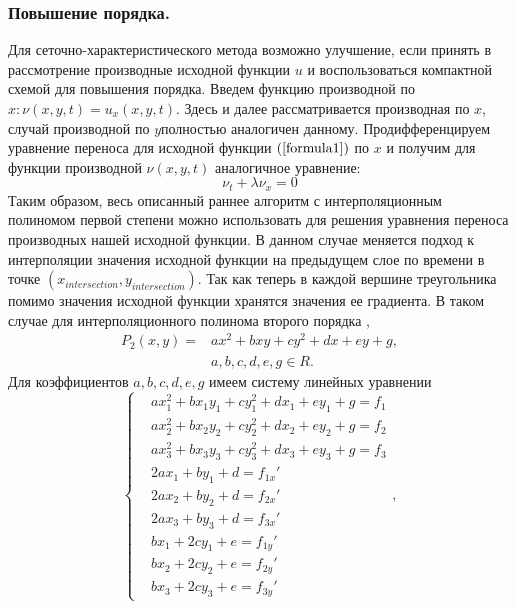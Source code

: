 \documentclass[14pt]{article}
\begin{document}
\subsubsection{Повышение порядка.}
Для сеточно-характеристического метода возможно улучшение, если принять в рассмотрение производные исходной функции $u$ и воспользоваться компактной схемой для повышения порядка. Введем функцию производной по $x: \nu(x,y,t)=u_x (x,y,t)$. Здесь и далее рассматривается производная по $x$, случай производной по $y $полностью аналогичен данному. Продифференцируем уравнение переноса для исходной функции $(\ref{formula1})$ по $x$ и получим для функции производной $\nu(x,y,t)$ аналогичное уравнение:
\begin{equation}
\nu_t+\lambda \nu_x=0
\end{equation}
Таким образом, весь описанный раннее алгоритм с интерполяционным полиномом первой степени можно использовать для решения уравнения переноса производных нашей исходной функции. В данном случае меняется подход к интерполяции значения исходной функции на предыдущем слое по времени в точке $(x_{intersection},y_{intersection})$. Так как теперь в каждой вершине треугольника помимо значения исходной функции хранятся значения ее градиента. В таком случае для интерполяционного полинома второго порядка ,
\begin{equation}
\begin{aligned}
P_2 (x,y)=&ax^2+bxy+cy^2+dx+ey+g,\\
&a,b,c,d,e,g \in R.
\end{aligned}
\end{equation}
Для коэффициентов $a,b,c,d,e,g $ имеем систему линейных уравнении
\begin{equation}
\left\lbrace
\begin{aligned}
&ax_1^2+bx_1 y_1+cy_1^2+dx_1+ey_1+g=f_1\\
&ax_2^2+bx_2 y_2+cy_2^2+dx_2+ey_2+g=f_2\\
&ax_3^2+bx_3 y_3+cy_3^2+dx_3+ey_3+g=f_3\\
&2ax_1+by_1+d= f_{1x}'\\
&2ax_2+by_2+d= f_{2x}'\\
&2ax_3+by_3+d= f_{3x}'\\
&bx_1+2cy_1+e= f_{1y}'\\
&bx_2+2cy_2+e= f_{2y}'\\
&bx_3+2cy_3+e= f_{3y}'
\end{aligned},
\right .
\end{equation}
\end{document}
